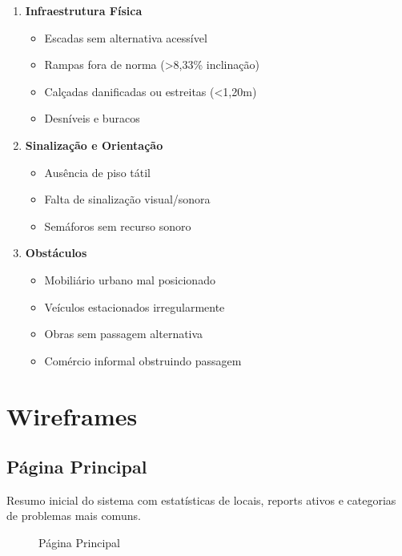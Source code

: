 \documentclass[12pt,a4paper]{article}
\begin{document}
\begin{enumerate}
    \item \textbf{Infraestrutura Física}
    \begin{itemize}
        \item Escadas sem alternativa acessível
    \item Rampas fora de norma (\textgreater{}8,33\% inclinação)
    \item Calçadas danificadas ou estreitas (\textless{}1,20m)
        \item Desníveis e buracos
    \end{itemize}
    
    \item \textbf{Sinalização e Orientação}
    \begin{itemize}
        \item Ausência de piso tátil
        \item Falta de sinalização visual/sonora
        \item Semáforos sem recurso sonoro
    \end{itemize}
    
    \item \textbf{Obstáculos}
    \begin{itemize}
        \item Mobiliário urbano mal posicionado
        \item Veículos estacionados irregularmente
        \item Obras sem passagem alternativa
        \item Comércio informal obstruindo passagem
    \end{itemize}
\end{enumerate}

\section{Wireframes}
\label{sec:wireframes}

\subsection{Página Principal}
Resumo inicial do sistema com estatísticas de locais, reports ativos e categorias de problemas mais comuns.

\begin{figure}[H]
\centering
{}
\caption{Página Principal}
\end{figure}
\end{document}
